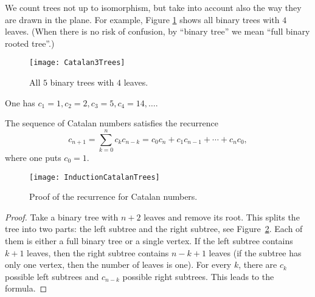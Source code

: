 \begin{page}
\setcounter{section}{4}
\setcounter{subsection}{1}
\setcounter{dfn}{1}
\label{portion:859}

We count trees not up to isomorphism, but take into account also the way they are drawn in the plane.
For example, Figure \ref{fig:Catalan3Trees} shows all binary trees with $4$ leaves.
(When there is no risk of confusion, by ``binary tree'' we mean ``full binary rooted tree''.)

\begin{figure}[ht]
\begin{center}
\texttt{[image: Catalan3Trees]}
\end{center}
\caption{All $5$ binary trees with $4$ leaves.}
\label{fig:Catalan3Trees}
\end{figure}

One has $c_1 = 1, c_2 = 2, c_3 = 5, c_4 = 14, \ldots$.


\end{page}

\begin{page}
\setcounter{section}{4}
\setcounter{subsection}{1}
\setcounter{dfn}{2}
\label{portion:861}

\begin{thm}
The sequence of Catalan numbers satisfies the recurrence
\begin{equation}
\label{eqn:CatalanRecursion}
c_{n+1} = \sum_{k=0}^n c_k c_{n-k} = c_0c_n + c_1c_{n-1} + \cdots + c_nc_0,
\end{equation}
where one puts $c_0 = 1$.
\end{thm}

\end{page}

\begin{page}
\setcounter{section}{4}
\setcounter{subsection}{2}
\setcounter{dfn}{2}
\label{portion:862}


\begin{figure}[ht]
\begin{center}
\texttt{[image: InductionCatalanTrees]}
\end{center}
\caption{Proof of the recurrence for Catalan numbers.}
\label{fig:InductionCatalanTrees}
\end{figure}

\begin{proof}
Take a binary tree with $n+2$ leaves and remove its root.
This splits the tree into two parts: the left subtree and the right subtree, see Figure~\ref{fig:InductionCatalanTrees}.
Each of them is either a full binary tree or a single vertex.
If the left subtree contains $k+1$ leaves, then the right subtree contains $n-k+1$ leaves
(if the subtree has only one vertex, then the number of leaves is one).
For every $k$, there are $c_k$ possible left subtrees and $c_{n-k}$ possible right subtrees.
This leads to the formula.
\end{proof}



\end{page}

